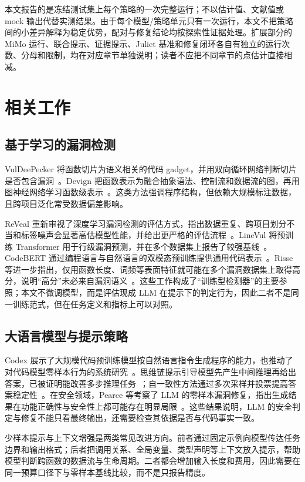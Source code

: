 \documentclass[conference]{IEEEtran}
\begin{document}
本文报告的是冻结测试集上每个策略的一次完整运行；不以估计值、文献值或 mock 输出代替实测结果。由于每个模型/策略单元只有一次运行，本文不把策略间的小差异解释为稳定优势，配对与修复结论均按探索性证据处理。扩展部分的 MiMo 运行、联合提示、证据提示、Juliet 基准和修复闭环各自有独立的运行次数、分母和限制，均在对应章节单独说明；读者不应把不同章节的点估计直接相减。

\section{相关工作}
\label{sec:related}

\subsection{基于学习的漏洞检测}
VulDeePecker 将函数切片为语义相关的代码 gadget，并用双向循环网络判断切片是否包含漏洞~\cite{li2018vuldeepecker}。Devign 把函数表示为融合抽象语法、控制流和数据流的图，再用图神经网络学习函数级表示~\cite{zhou2019devign}。这类方法强调程序结构，但依赖大规模标注数据，且跨项目泛化常受数据偏差影响。

ReVeal 重新审视了深度学习漏洞检测的评估方式，指出数据重复、跨项目划分不当和标签噪声会显著高估模型性能，并给出更严格的评估流程~\cite{chakraborty2021reveal}。LineVul 将预训练 Transformer 用于行级漏洞预测，并在多个数据集上报告了较强基线~\cite{fu2022linevul}。CodeBERT 通过编程语言与自然语言的双模态预训练提供通用代码表示~\cite{feng2020codebert}。Risse 等进一步指出，仅用函数长度、词频等表面特征就可能在多个漏洞数据集上取得高分，说明“高分”未必来自漏洞语义~\cite{risse2024limits,risse2025topscore}。这些工作构成了“训练型检测器”的主要参照；本文不微调模型，而是评估现成 LLM 在提示下的判定行为，因此二者不是同一训练范式，但在任务定义和指标上可以对照。

\subsection{大语言模型与提示策略}
Codex 展示了大规模代码预训练模型按自然语言指令生成程序的能力，也推动了对代码模型零样本行为的系统研究~\cite{chen2021codex}。思维链提示引导模型先产生中间推理再给出答案，已被证明能改善多步推理任务~\cite{wei2022cot}；自一致性方法通过多次采样并投票提高答案稳定性~\cite{wang2023selfconsistency}。在安全领域，Pearce 等考察了 LLM 的零样本漏洞修复，指出生成结果在功能正确性与安全性上都可能存在明显局限~\cite{pearce2023zeroshot}。这些结果说明，LLM 的安全判定与修复不能只看最终输出，还需要检查其依据是否与代码事实一致。

少样本提示与上下文增强是两类常见改进方向。前者通过固定示例向模型传达任务边界和输出格式；后者把调用关系、全局变量、类型声明等上下文放入提示，帮助模型判断跨函数的数据流与生命周期。二者都会增加输入长度和费用，因此需要在同一预算口径下与零样本基线比较，而不是只报告精度。
\end{document}
